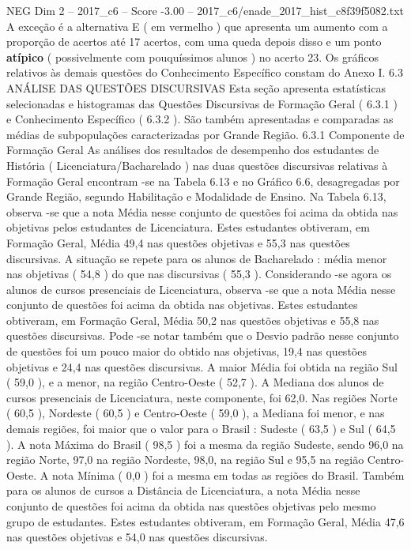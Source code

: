 \begin{textsample}{NEG Dim 2 – 2017\_c6 – Score -3.00 – 2017\_c6/enade\_2017\_hist\_c8f39f5082.txt}
A exceção é a alternativa E ( em vermelho ) que apresenta um aumento com a proporção de acertos até 17 acertos, com uma queda depois disso e um ponto \textbf{atípico} ( possivelmente com pouquíssimos alunos ) no acerto 23.
Os gráficos relativos às demais questões do Conhecimento Específico constam do Anexo I. 6.3 ANÁLISE DAS QUESTÕES DISCURSIVAS Esta seção apresenta estatísticas selecionadas e histogramas das Questões Discursivas de Formação Geral ( 6.3.1 ) e Conhecimento Específico ( 6.3.2 ).
São também apresentadas e comparadas as médias de subpopulações caracterizadas por Grande Região. 6.3.1 Componente de Formação Geral As análises dos resultados de desempenho dos estudantes de História ( Licenciatura/Bacharelado ) nas duas questões discursivas relativas à Formação Geral encontram -se na Tabela 6.13 e no Gráfico 6.6, desagregadas por Grande Região, segundo Habilitação e Modalidade de Ensino.
Na Tabela 6.13, observa -se que a nota Média nesse conjunto de questões foi acima da obtida nas objetivas pelos estudantes de Licenciatura.
Estes estudantes obtiveram, em Formação Geral, Média 49,4 nas questões objetivas e 55,3 nas questões discursivas.
A situação se repete para os alunos de Bacharelado : média menor nas objetivas ( 54,8 ) do que nas discursivas ( 55,3 ).
Considerando -se agora os alunos de cursos presenciais de Licenciatura, observa -se que a nota Média nesse conjunto de questões foi acima da obtida nas objetivas.
Estes estudantes obtiveram, em Formação Geral, Média 50,2 nas questões objetivas e 55,8 nas questões discursivas.
Pode -se notar também que o Desvio padrão nesse conjunto de questões foi um pouco maior do obtido nas objetivas, 19,4 nas questões objetivas e 24,4 nas questões discursivas.
A maior Média foi obtida na região Sul ( 59,0 ), e a menor, na região Centro-Oeste ( 52,7 ).
A Mediana dos alunos de cursos presenciais de Licenciatura, neste componente, foi 62,0.
Nas regiões Norte ( 60,5 ), Nordeste ( 60,5 ) e Centro-Oeste ( 59,0 ), a Mediana foi menor, e nas demais regiões, foi maior que o valor para o Brasil : Sudeste ( 63,5 ) e Sul ( 64,5 ).
A nota Máxima do Brasil ( 98,5 ) foi a mesma da região Sudeste, sendo 96,0 na região Norte, 97,0 na região Nordeste, 98,0, na região Sul e 95,5 na região Centro-Oeste.
A nota Mínima ( 0,0 ) foi a mesma em todas as regiões do Brasil.
Também para os alunos de cursos a Distância de Licenciatura, a nota Média nesse conjunto de questões foi acima da obtida nas questões objetivas pelo mesmo grupo de estudantes.
Estes estudantes obtiveram, em Formação Geral, Média 47,6 nas questões objetivas e 54,0 nas questões discursivas.

\end{textsample}
